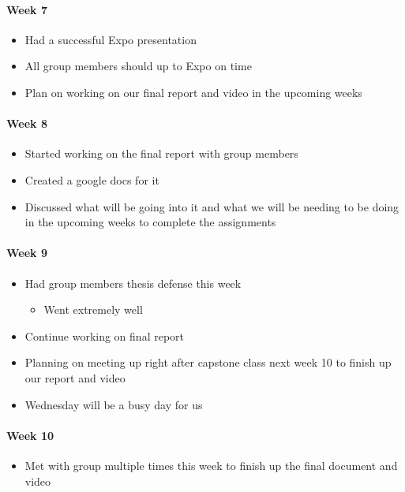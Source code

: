 \documentclass[onecolumn, draftclsnofoot,10pt, compsoc]{IEEEtran}
\begin{document}
      \paragraph{Week 7}
        \begin{itemize}
          \item Had a successful Expo presentation
          \item All group members should up to Expo on time
          \item Plan on working on our final report and video in the upcoming weeks
        \end{itemize}

      \paragraph{Week 8}
        \begin{itemize}
          \item Started working on the final report with group members
          \item Created a google docs for it
          \item Discussed what will be going into it and what we will be needing to be doing in the upcoming weeks to complete the assignments
        \end{itemize}

      \paragraph{Week 9}
        \begin{itemize}
          \item Had group members thesis defense this week
          \begin{itemize}
            \item Went extremely well
          \end{itemize}
          \item Continue working on final report
          \item Planning on meeting up right after capstone class next week 10 to finish up our report and video
          \item Wednesday will be a busy day for us
        \end{itemize}

      \paragraph{Week 10}
        \begin{itemize}
          \item Met with group multiple times this week to finish up the final document and video
        \end{itemize}
\end{document}

